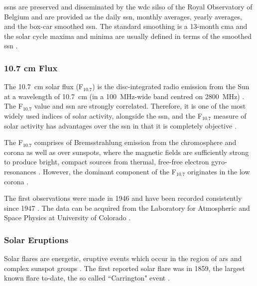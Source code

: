 \glspl{ssn} are preserved and disseminated by the \gls{wdc} \gls{silso} of the Royal Observatory of Belgium \citep{silso_world_data_center_international_2020} and are provided as the daily \gls{ssn}, monthly averages, yearly averages, and the box-car smoothed \gls{ssn}. The standard smoothing is a 13-month \gls{cma} and the solar cycle maxima and minima are usually defined in terms of the smoothed \gls{ssn} \citep{hathaway_solar_2015}.


\subsubsection*{10.7 cm Flux}

The 10.7~cm solar flux (F$_{10.7}$) is the disc-integrated radio emission from the Sun at a wavelength of 10.7~cm (in a 100~MHz-wide band centred on 2800~MHz) \citep{tapping_limits_1994,tapping_107_2013}. The F$_{10.7}$ value and \gls{ssn} are strongly correlated. Therefore, it is one of the most widely used indices of solar activity, alongside the \gls{ssn}, and the F$_{10.7}$ measure of solar activity has advantages over the \gls{ssn} in that it is completely objective \citep{hathaway_solar_2015}.

The F$_{10.7}$ comprises of Bremsstrahlung emission from the chromosphere and corona as well as over sunspots, where the magnetic fields are sufficiently strong to produce bright, compact sources from thermal, free-free electron gyro-resonances \citep{tapping_origin_1990, tapping_107_2013}. However, the dominant component of the F$_{10.7}$ originates in the low corona \citep{tapping_origin_1990}.%

The first observations were made in 1946 and have been recorded consistently since 1947 \citep{covington_solar_1969, tapping_107_2013}. The data can be acquired from the Laboratory for Atmospheric and Space Physics at University of Colorado \citep{lisird_solar_2019}.



\glsresetall 
{}
\subsubsection*{Solar Eruptions}
Solar flares are energetic, eruptive events which occur in the region of \glspl{ar} and complex sunspot groups \citep{hathaway_solar_2015}. The first reported solar flare was in 1859, the largest known flare to-date, the so called ``Carrington" event \citep{carrington_description_1859}.

